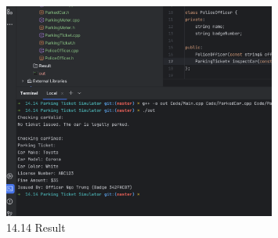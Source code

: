 \documentclass{article}
\begin{document}
\begin{figure}[H]
    \centering
    \includegraphics[width=0.8\textwidth]{./Assets/Results/Assignment12/4.png}
    \caption{14.14 Result}
\end{figure}
\end{document}
